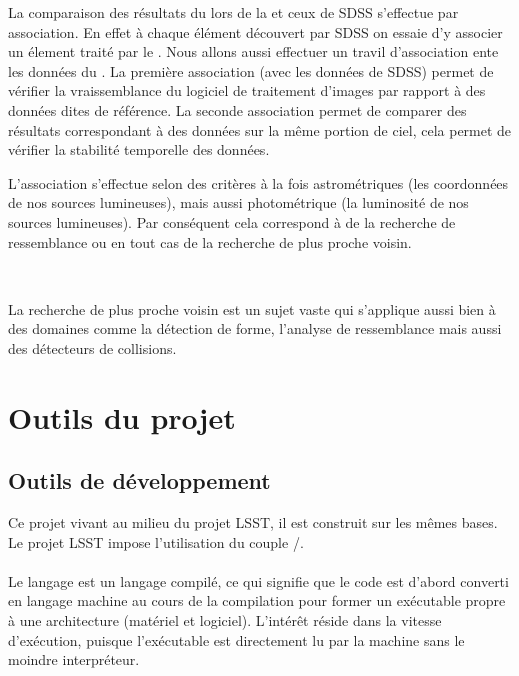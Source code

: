 La comparaison des résultats du \stack{} lors de la \DC{} et ceux de SDSS s'effectue par association. En effet à chaque élément découvert par SDSS on essaie d'y associer un élement traité par le \stack{}. Nous allons aussi effectuer un travil d'association ente les données du \stack{}. La première association (avec les données de SDSS) permet de vérifier la vraissemblance du logiciel de traitement d'images par rapport à des données dites de référence. La seconde association permet de comparer des résultats correspondant à des données sur la même portion de ciel, cela permet de vérifier la stabilité temporelle des données.

L'association s'effectue selon des critères à la fois astrométriques (les coordonnées de nos sources lumineuses), mais aussi photométrique (la luminosité de nos sources lumineuses). Par conséquent cela correspond à de la recherche de ressemblance ou en tout cas de la recherche de plus proche voisin.

\ 

La recherche de plus proche voisin est un sujet vaste qui s'applique aussi bien à des domaines comme la détection de forme, l'analyse de ressemblance mais aussi des détecteurs de collisions.

\section{Outils du projet}

	\subsection{Outils de développement}

Ce projet vivant au milieu du projet LSST, il est construit sur les mêmes bases. Le projet LSST impose l'utilisation du couple \Cpp{}/\Python{}.

			\paragraph{\Cpp}
Le langage \Cpp{} est un langage compilé, ce qui signifie que le code est d'abord converti en langage machine au cours de la compilation pour former un exécutable propre à une architecture (matériel et logiciel). L'intérêt réside dans la vitesse d'exécution, puisque l'exécutable est directement lu par la machine sans le moindre interpréteur.

